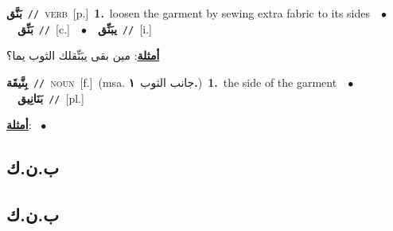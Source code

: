 \documentclass[10pt,a4paper,twoside]{article} %
\begin{document}
\begin{multicols}{2}
{\setlength\topsep{0pt}\textbf{\foreignlanguage{arabic}{بَنَّق}}\ {\color{gray}\texttt{//}\color{black}}\ \textsc{verb}\ [p.]\ \textbf{1.}~loosen the garment by sewing extra fabric to its sides\ \ $\bullet$\ \ \setlength\topsep{0pt}\textbf{\foreignlanguage{arabic}{بَنِّق}}\ {\color{gray}\texttt{//}\color{black}}\ [c.]\ \ $\bullet$\ \ \setlength\topsep{0pt}\textbf{\foreignlanguage{arabic}{يبَنِّق}}\ {\color{gray}\texttt{//}\color{black}}\ [i.]\  \begin{flushright}\color{gray}\foreignlanguage{arabic}{\textbf{\underline{\foreignlanguage{arabic}{أمثلة}}}: مين بقى يبَنِّقلك الثوب يما؟}\end{flushright}\color{black}} \vspace{2mm}

{\setlength\topsep{0pt}\textbf{\foreignlanguage{arabic}{بِنَّيقَة}}\ {\color{gray}\texttt{//}\color{black}}\ \textsc{noun}\ [f.]\ \color{gray}(msa. \foreignlanguage{arabic}{جانب الثوب}~\foreignlanguage{arabic}{\textbf{١.}})\color{black}\ \textbf{1.}~the side of the garment\ \ $\bullet$\ \ \setlength\topsep{0pt}\textbf{\foreignlanguage{arabic}{بَنَانِيق}}\ {\color{gray}\texttt{//}\color{black}}\ [pl.]\  \begin{flushright}\color{gray}\foreignlanguage{arabic}{\textbf{\underline{\foreignlanguage{arabic}{أمثلة}}}: \ $\bullet$\ \  }\end{flushright}\color{black}} \vspace{2mm}

\vspace{-3mm}
\subsection*{\color{blue}\foreignlanguage{arabic}{ب.ن.ك}\color{blue}{}} 

\vspace{-3mm}
\subsection*{\color{blue}\foreignlanguage{arabic}{ب.ن.ك}\color{blue}{ (ntws)}} 


\end{multicols}
\end{document}
